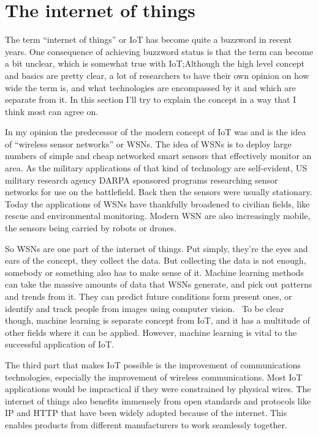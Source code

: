 \section{The internet of things}
\label{sec:iot}

The term ``internet of things'' or IoT has become quite a buzzword in recent
years. One consequence of achieving buzzword status is that the term can become
a bit unclear, which is somewhat true with IoT;\@ Although the high level concept
and basics are pretty clear, a lot of researchers to have their own opinion on
how wide the term is, and what technologies are encompassed by it and which are
separate from it. In this section I'll try to explain the concept in a way that
I think most can agree on.

In my opinion the predecessor of the modern concept of IoT was and is the idea
of ``wireless sensor networks'' or WSNs. The idea of WSNs is to deploy large
numbers of simple and cheap networked smart sensors that effectively monitor an
area. As the military applications of that kind of technology are self-evident,
US military research agency DARPA sponsored programs researching sensor
networks for use on the battlefield. Back then the sensors were usually
stationary. Today the applications of WSNs have thankfully broadened to
civilian fields, like rescue and environmental monitoring. Modern WSN are also 
increasingly mobile, the sensors being carried by robots or
drones.~\cite{Chong2003}

So WSNs are one part of the internet of things. Put simply, they're the eyes
and ears of the concept, they collect the data. But collecting the data is not
enough, somebody or something also has to make sense of it. Machine learning
methods can take the massive amounts of data that WSNs generate, and pick out
patterns and trends from it. They can predict future conditions form present
ones, or identify and track people from images using computer
vision.~\cite{Gubbi2013} To be clear though, machine learning is separate
concept from IoT, and it has a multitude of other fields where it can be
applied. However, machine learning is vital to the successful application of
IoT.

The third part that makes IoT possible is the improvement of communications
technologies, especially the improvement of wireless communications. Most IoT
applications would be impractical if they were constrained by physical wires.
The internet of things also benefits immensely from open standards and
protocols like IP and HTTP that have been widely adopted because of the
internet. This enables products from different manufacturers to work seamlessly
together.


